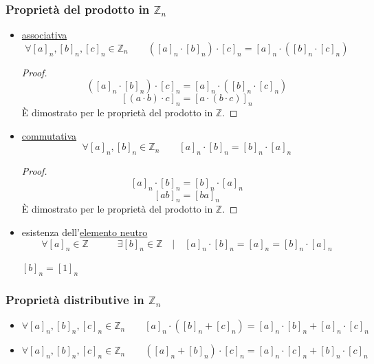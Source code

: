 \documentclass[a4paper,12pt, oneside]{book}
\begin{document}
\subsubsection{Proprietà del prodotto in $\mathbb{Z}_n$}
\begin{itemize}
	\item \underline{associativa}
	      $$\forall [a]_n, [b]_n, [c]_n \in \mathbb{Z}_n \qquad ([a]_n \cdot [b]_n) \cdot [c]_n = [a]_n \cdot ([b]_n \cdot [c]_n)$$
	      \begin{proof}
		      $$([a]_n \cdot [b]_n) \cdot [c]_n = [a]_n \cdot ([b]_n \cdot [c]_n)$$
		      $$[(a \cdot b) \cdot c]_n = [a \cdot (b \cdot c)]_n$$
		      È dimostrato per le proprietà del prodotto in $\mathbb{Z}$.
	      \end{proof}
	\item \underline{commutativa}
	      $$\forall [a]_n, [b]_n \in \mathbb{Z}_n \qquad [a]_n \cdot [b]_n = [b]_n \cdot [a]_n$$
	      \begin{proof}
		      $$[a]_n \cdot [b]_n = [b]_n \cdot [a]_n$$
		      $$[ab]_n = [ba]_n$$
		      È dimostrato per le proprietà del prodotto in $\mathbb{Z}$.
	      \end{proof}
	\item esistenza dell'\underline{elemento neutro}
	      $$\forall [a]_n \in \mathbb{Z} \qquad\quad \exists [b]_n \in \mathbb{Z} \quad | \quad [a]_n \cdot [b]_n=[a]_n=[b]_n \cdot [a]_n$$
	      \begin{nota}
		      $[b]_n = [1]_n$
	      \end{nota}
\end{itemize}

\subsubsection{Proprietà distributive in $\mathbb{Z}_n$}
\begin{itemize}
	\item $\forall [a]_n, [b]_n, [c]_n \in \mathbb{Z}_n \qquad [a]_n \cdot ([b]_n + [c]_n) = [a]_n \cdot [b]_n + [a]_n \cdot [c]_n$
	\item $\forall [a]_n, [b]_n, [c]_n \in \mathbb{Z}_n \qquad ([a]_n + [b]_n) \cdot [c]_n = [a]_n \cdot [c]_n + [b]_n \cdot [c]_n$
\end{itemize}
\end{document}
